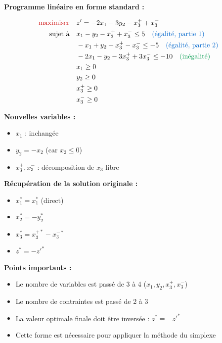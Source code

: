 \documentclass[12pt,a4paper]{article}
\begin{document}
\begin{solution}
\textbf{Programme linéaire en forme standard :}

\begin{align*}
\text{\textcolor{importantrouge}{maximiser}} \quad & z' = -2x_1 - 3y_2 - x_3^+ + x_3^-\\
\text{sujet à} \quad & x_1 - y_2 - x_3^+ + x_3^- \leq 5 \quad \textcolor{titrebleu}{\text{(égalité, partie 1)}}\\
& -x_1 + y_2 + x_3^+ - x_3^- \leq -5 \quad \textcolor{titrebleu}{\text{(égalité, partie 2)}}\\
& -2x_1 - y_2 - 3x_3^+ + 3x_3^- \leq -10 \quad \textcolor{defvert}{\text{(inégalité)}}\\
& x_1 \geq 0\\
& y_2 \geq 0\\
& x_3^+ \geq 0\\
& x_3^- \geq 0
\end{align*}

\textbf{Nouvelles variables :}
\begin{itemize}
    \item $x_1$ : inchangée
    \item $y_2 = -x_2$ (car $x_2 \leq 0$)
    \item $x_3^+, x_3^-$ : décomposition de $x_3$ libre
\end{itemize}

\textbf{Récupération de la solution originale :}
\begin{itemize}
    \item $x_1^* = x_1^*$ (direct)
    \item $x_2^* = -y_2^*$
    \item $x_3^* = x_3^{+*} - x_3^{-*}$
    \item $z^* = -z'^*$
\end{itemize}
\end{solution}

\begin{remarque}
\textbf{Points importants :}
\begin{itemize}
    \item Le nombre de variables est passé de 3 à 4 ($x_1, y_2, x_3^+, x_3^-$)
    \item Le nombre de contraintes est passé de 2 à 3
    \item La valeur optimale finale doit être inversée : $z^* = -z'^*$
    \item Cette forme est nécessaire pour appliquer la méthode du simplexe
\end{itemize}
\end{remarque}
\end{document}
